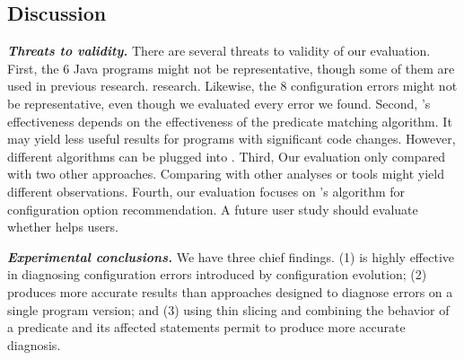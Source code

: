 \subsection{Discussion}

\noindent \textbf{\textit{Threats to validity.}}
There are several threats to validity of our evaluation.
First, the 6 Java programs might not be representative, though some of them are used
in previous research. research. Likewise, the
8 configuration errors might not be representative, even though we
evaluated every error we found. Second, 
\ourtool's effectiveness depends on the effectiveness of the
predicate matching algorithm. It may yield less
useful results for programs with significant code changes.
However, different algorithms can be plugged into \ourtool.
Third, Our evaluation only compared \ourtool with two other
approaches. Comparing with other analyses or tools might yield
different observations.
Fourth, our evaluation focuses on \ourtool's algorithm for
configuration option recommendation. A future user study should
evaluate whether \ourtool helps users.

\vspace{1mm}

\noindent \textbf{\textit{Experimental conclusions.}}
We have three chief findings. (1) \ourtool is highly effective
in diagnosing configuration errors introduced by configuration
evolution; (2) \ourtool produces more accurate results than
approaches designed to diagnose errors on a single program version;
and (3) using thin slicing and combining the behavior of
a predicate and its affected statements permit \ourtool
to produce more accurate diagnosis.

